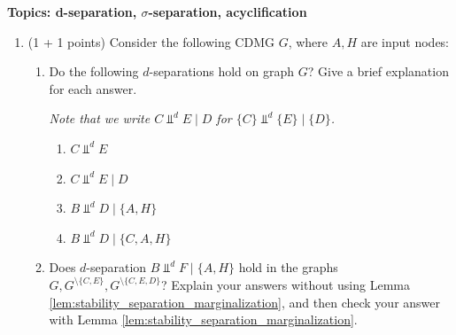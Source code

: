

\flushleft\textbf{Topics: d-separation, $\sigma$-separation, acyclification}
\begin{enumerate}

\item (1 + 1 points)
Consider the following CDMG $G$, where $A,H$ are input nodes:
\begin{figure}[ht]
  \centering
\end{figure}
\begin{enumerate}
  \item Do the following $d$-separations hold on graph $G$? Give a brief explanation for each answer. 
  
  \emph{Note that we write $C \Perp^d E \mid D$ for $\{C\} \Perp^d \{E\} \mid \{D\}$.}
  \begin{enumerate}
    \item $\displaystyle  C \Perp^d E$
    \item $\displaystyle C \Perp^d E \mid D$
    \item $\displaystyle B \Perp^d D \mid \{A, H\}$
    \item $\displaystyle B \Perp^d D \mid \{C, A, H\}$
  \end{enumerate}
  \item Does $d$-separation $\displaystyle B \Perp^d F \mid \{A, H\}$ hold in the graphs $G, G^{\setminus \{C,E\}},G^{\setminus \{C,E,D\}}$? Explain your answers without using Lemma \ref*{lem:stability_separation_marginalization}, and then check your answer with Lemma \ref*{lem:stability_separation_marginalization}.
  

\end{enumerate}
\end{enumerate}

